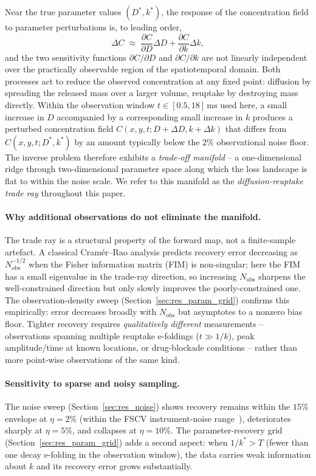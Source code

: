 \documentclass[12pt]{article}
\begin{document}
Near the true parameter values $(D^*, k^*)$, the response of the
concentration field to parameter perturbations is, to leading
order,
\begin{equation*}
  \Delta C \;\approx\; \frac{\partial C}{\partial D} \Delta D
                     + \frac{\partial C}{\partial k} \Delta k,
\end{equation*}
and the two sensitivity functions $\partial C/\partial D$ and
$\partial C/\partial k$ are not linearly independent over the
practically observable region of the spatiotemporal domain. Both
processes act to reduce the observed concentration at any fixed
point: diffusion by spreading the released mass over a larger
volume, reuptake by destroying mass directly. Within the
observation window $t \in [0.5, 18]\,\text{ms}$ used here, a small
increase in $D$ accompanied by a corresponding small increase in
$k$ produces a perturbed concentration field
$C(x, y, t; D + \Delta D, k + \Delta k)$ that differs from
$C(x, y, t; D^*, k^*)$ by an amount typically below the $2\%$
observational noise floor. The inverse problem therefore exhibits
a \emph{trade-off manifold} -- a one-dimensional ridge through
two-dimensional parameter space along which the loss landscape is
flat to within the noise scale. We refer to this manifold as the
\emph{diffusion-reuptake trade ray} throughout this paper.

\paragraph{Why additional observations do not eliminate the
manifold.}
The trade ray is a structural property of the forward map, not
a finite-sample artefact. A classical Cram\'er--Rao analysis
predicts recovery error decreasing as $N_{\mathrm{obs}}^{-1/2}$
when the Fisher information matrix (FIM) is non-singular; here
the FIM has a small eigenvalue in the trade-ray direction, so
increasing $N_{\mathrm{obs}}$ sharpens the well-constrained
direction but only slowly improves the poorly-constrained one.
The observation-density sweep (Section~\ref{sec:res_param_grid})
confirms this empirically: error decreases broadly with
$N_{\mathrm{obs}}$ but asymptotes to a nonzero bias floor.
Tighter recovery requires \emph{qualitatively different}
measurements -- observations spanning multiple reuptake
e-foldings ($t \gg 1/k$), peak amplitude/time at known
locations, or drug-blockade conditions -- rather than more
point-wise observations of the same kind.

\paragraph{Sensitivity to sparse and noisy sampling.}
The noise sweep (Section~\ref{sec:res_noise}) shows recovery
remains within the $15\%$ envelope at $\eta = 2\%$ (within the
FSCV instrument-noise range~\cite{Rodeberg2017}), deteriorates
sharply at $\eta = 5\%$, and collapses at $\eta = 10\%$. The
parameter-recovery grid (Section~\ref{sec:res_param_grid})
adds a second aspect: when $1/k^* > T$ (fewer than one decay
e-folding in the observation window), the data carries weak
information about $k$ and its recovery error grows
substantially.
\end{document}
